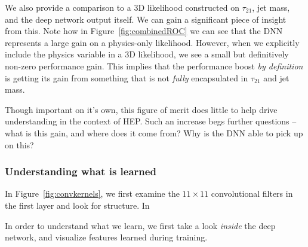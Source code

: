 We also provide a comparison to a 3D likelihood constructed on $\tau_{21}$, jet mass, and the deep network output itself. We can gain a significant piece of insight from this. Note how in Figure~\ref{fig:combinedROC} we can see that the DNN represents a large gain on a physics-only likelihood. However, when we explicitly include the physics variable in a 3D likelihood, we see a small but definitively non-zero performance gain. This implies that the performance boost \emph{by definition} is getting its gain from something that is not \emph{fully} encapsulated in $\tau_{21}$ and jet mass. 

Though important on it's own, this figure of merit does little to help drive understanding in the context of HEP. Such an increase begs further questions -- what is this gain, and where does it come from? Why is the DNN able to pick up on this?



\subsubsection{Understanding what is learned} %
\label{ssub:understanding_what_is_learned}

In Figure~\ref{fig:convkernels}, we first examine the $11\times11$ convolutional filters in the first layer and look for structure. In

In order to understand what we learn, we first take a look \emph{inside} the deep network, and visualize features learned during training.

